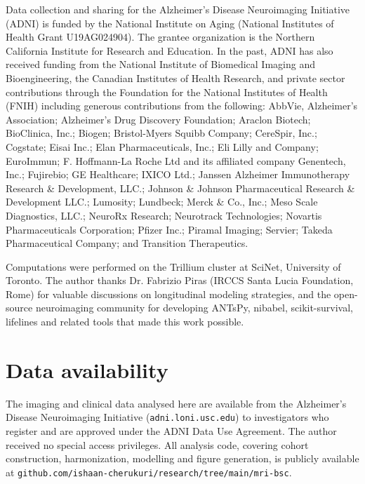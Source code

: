 \documentclass[blue]{ludusofficial}  %
\begin{document}
\begin{acknowledgments}
Data collection and sharing for the Alzheimer's Disease Neuroimaging Initiative (ADNI) is funded by the National Institute on Aging (National Institutes of Health Grant U19AG024904). The grantee organization is the Northern California Institute for Research and Education. In the past, ADNI has also received funding from the National Institute of Biomedical Imaging and Bioengineering, the Canadian Institutes of Health Research, and private sector contributions through the Foundation for the National Institutes of Health (FNIH) including generous contributions from the following: AbbVie, Alzheimer's Association; Alzheimer's Drug Discovery Foundation; Araclon Biotech; BioClinica, Inc.; Biogen; Bristol-Myers Squibb Company; CereSpir, Inc.; Cogstate; Eisai Inc.; Elan Pharmaceuticals, Inc.; Eli Lilly and Company; EuroImmun; F. Hoffmann-La Roche Ltd and its affiliated company Genentech, Inc.; Fujirebio; GE Healthcare; IXICO Ltd.; Janssen Alzheimer Immunotherapy Research \& Development, LLC.; Johnson \& Johnson Pharmaceutical Research \& Development LLC.; Lumosity; Lundbeck; Merck \& Co., Inc.; Meso Scale Diagnostics, LLC.; NeuroRx Research; Neurotrack Technologies; Novartis Pharmaceuticals Corporation; Pfizer Inc.; Piramal Imaging; Servier; Takeda Pharmaceutical Company; and Transition Therapeutics.

Computations were performed on the Trillium cluster at SciNet, University of Toronto. The author thanks Dr. Fabrizio Piras (IRCCS Santa Lucia Foundation, Rome) for valuable discussions on longitudinal modeling strategies, and the open-source neuroimaging community for developing ANTsPy, nibabel, scikit-survival, lifelines and related tools that made this work possible.
\end{acknowledgments}

\section*{Data availability}

The imaging and clinical data analysed here are available from the Alzheimer's Disease Neuroimaging Initiative (\texttt{adni.loni.usc.edu}) to investigators who register and are approved under the ADNI Data Use Agreement. The author received no special access privileges. All analysis code, covering cohort construction, harmonization, modelling and figure generation, is publicly available at \texttt{github.com/ishaan-cherukuri/research/tree/main/mri-bsc}.




\end{document}
